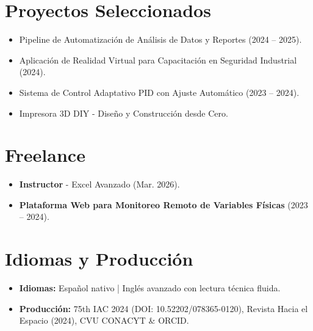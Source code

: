 \documentclass[10pt,a4paper]{article}
\begin{document}
\section*{Proyectos Seleccionados}
\begin{itemize}[leftmargin=*, noitemsep]
    \item Pipeline de Automatización de Análisis de Datos y Reportes (2024 -- 2025).
    \item Aplicación de Realidad Virtual para Capacitación en Seguridad Industrial (2024).
    \item Sistema de Control Adaptativo PID con Ajuste Automático (2023 -- 2024).
    \item Impresora 3D DIY - Diseño y Construcción desde Cero.
\end{itemize}

\section*{Freelance}
\begin{itemize}[leftmargin=*, noitemsep]
    \item \textbf{Instructor} - Excel Avanzado (Mar. 2026).
    \item \textbf{Plataforma Web para Monitoreo Remoto de Variables Físicas} (2023 -- 2024).
\end{itemize}

\section*{Idiomas y Producción}
\begin{itemize}[leftmargin=*, noitemsep]
    \item \textbf{Idiomas:} Español nativo | Inglés avanzado con lectura técnica fluida.
    \item \textbf{Producción:} 75th IAC 2024 (DOI: 10.52202/078365-0120), Revista Hacia el Espacio (2024), CVU CONACYT \& ORCID.
\end{itemize}
\end{document}

